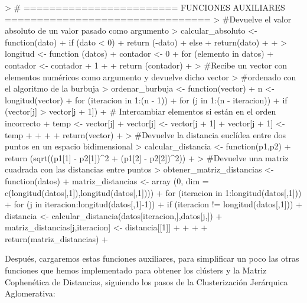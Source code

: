 \documentclass[parskip=full]{scrartcl}
\begin{document}
\begin{Schunk}
\begin{Sinput}
> # ======================== FUNCIONES AUXILIARES ================================
> #Devuelve el valor absoluto de un valor pasado como argumento
> calcular_absoluto <- function(dato){
+   if (dato < 0){
+     return (-dato)
+   }else{
+     return(dato)
+   }
+ }
> longitud <- function (datos){
+   contador <- 0
+   for (elemento in datos){
+     contador <- contador + 1
+   }
+   return (contador)
+ }
> #Recibe un vector con elementos numéricos como argumento y devuelve dicho vector 
> #ordenado con el algoritmo de la burbuja
> ordenar_burbuja <- function(vector) {
+   n <- longitud(vector)
+   for (iteracion in 1:(n - 1)) {
+     for (j in 1:(n - iteracion)) {
+       if (vector[j] > vector[j + 1]) {
+         # Intercambiar elementos si están en el orden incorrecto
+         temp <- vector[j]
+         vector[j] <- vector[j + 1]
+         vector[j + 1] <- temp
+       }
+     }
+   }
+   return(vector)
+ }
> #Devuelve la distancia euclídea entre dos puntos en un espacio bidimensional
> calcular_distancia <- function(p1,p2){
+   return (sqrt((p1[1] - p2[1])^2 + (p1[2] - p2[2])^2))
+ }
> #Devuelve una matriz cuadrada con las distancias entre puntos
> obtener_matriz_distancias <- function(datos) {
+   matriz_distancias <- array (0, dim = c(longitud(datos[,1]),longitud(datos[,1])))
+   for (iteracion in 1:longitud(datos[,1])){
+     for (j in iteracion:longitud(datos[,1]-1)){
+       if (iteracion != longitud(datos[,1])){
+         distancia <- calcular_distancia(datos[iteracion,],datos[j,])
+         matriz_distancias[j,iteracion] <- distancia[[1]]
+       }
+     }
+   }
+   return(matriz_distancias)
+ }
\end{Sinput}
\end{Schunk}


Después, cargaremos estas funciones auxiliares, para simplificar un poco las otras funciones que hemos implementado para obtener los clústers y la Matriz Cophenética de Distancias, siguiendo los pasos de la Clusterización Jerárquica Aglomerativa:
\end{document}
